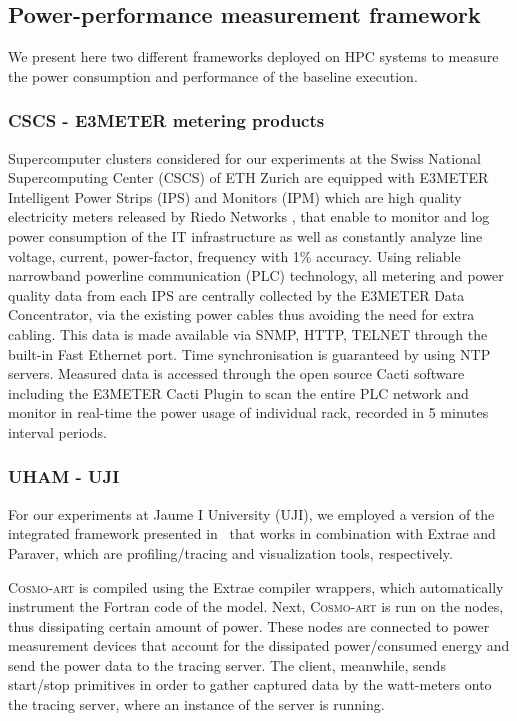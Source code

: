 \subsection{Power-performance measurement framework}
\label{subsec:3.3}

We present  here two different  frameworks deployed on HPC  systems to
measure  the  power  consumption   and  performance  of  the  baseline
execution.

\subsubsection{CSCS - E3METER metering products}

Supercomputer  clusters considered  for our  experiments at  the Swiss
National Supercomputing Center (CSCS)  of ETH Zurich are equipped with
E3METER Intelligent  Power Strips (IPS)  and Monitors (IPM)  which are
high   quality   electricity  meters   released   by  Riedo   Networks
\citep{Riedonetworks},   that  enable   to  monitor   and   log  power
consumption  of the IT  infrastructure as  well as  constantly analyze
line  voltage,  current, power-factor,  frequency  with 1\%  accuracy.
Using  reliable narrowband  powerline communication  (PLC) technology,
all  metering and  power  quality  data from  each  IPS are  centrally
collected  by the E3METER  Data Concentrator,  via the  existing power
cables thus  avoiding the need for  extra cabling.  This  data is made
available via  SNMP, HTTP, TELNET  through the built-in  Fast Ethernet
port.   Time  synchronisation  is  guaranteed by  using  NTP  servers.
Measured  data is  accessed  through the  open  source Cacti  software
including the E3METER Cacti Plugin  to scan the entire PLC network and
monitor in real-time the power usage of individual rack, recorded in 5
minutes interval periods.

\subsubsection{UHAM - UJI}

For our experiments at Jaume I University (UJI), we employed a version
of the integrated framework presented in~\cite{energy13} that works in
combination with  Extrae and Paraver, which  are profiling/tracing and
visualization tools, respectively.

\textsc{Cosmo-art}  is compiled  using the  Extrae  compiler wrappers,
which automatically  instrument the Fortran code of  the model.  Next,
\textsc{Cosmo-art}  is  run on  the  nodes,  thus dissipating  certain
amount  of power.   These  nodes are  connected  to power  measurement
devices that account for the dissipated power/consumed energy and send
the power  data to the  tracing server.  The client,  meanwhile, sends
start/stop  primitives  in  order  to  gather  captured  data  by  the
watt-meters onto the  tracing server, where an instance  of the \pmlib
server is running.

